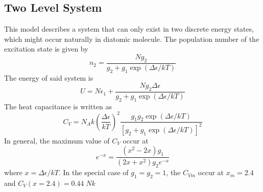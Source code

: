 \documentclass[../../../Main.tex]{subfiles}
\begin{document}
\subsection{Two Level System}
This model describes a system that can only exist in two discrete energy states, which might occur naturally in diatomic molecule. The population number of the excitation state is given by 
\begin{equation*}
    n_2=\frac{Ng_2}{g_2+g_1\exp(\Delta\epsilon/kT)}
\end{equation*}
The energy of said system is 
\begin{equation*}
    U=N\epsilon_1+\frac{Ng_2\Delta\epsilon}{g_2+g_1\exp(\Delta\epsilon/kT)}
\end{equation*}
The heat capacitance is written as 
\begin{equation*}
    C_V=N_Ak\left(\frac{\Delta\epsilon}{kT}\right)^2\frac{g_1g_2\exp(\Delta\epsilon/kT)}{\left[g_2+g_1\exp(\Delta\epsilon/kT)\right]^2}
\end{equation*}
In general, the maximum value of $C_V$ occur at
\begin{equation*}
   e^{-x}=\frac{(x^2-2x)g_1}{(2x+x^2)g_2e^{-x}} 
\end{equation*}
where $x=\Delta\epsilon/kT$. In the special case of $g_1=g_2=1$, the $C_{Vm}$ occur at $x_m=2.4$ and $C_V(x=2.4)=0.44\;Nk$
\end{document}
